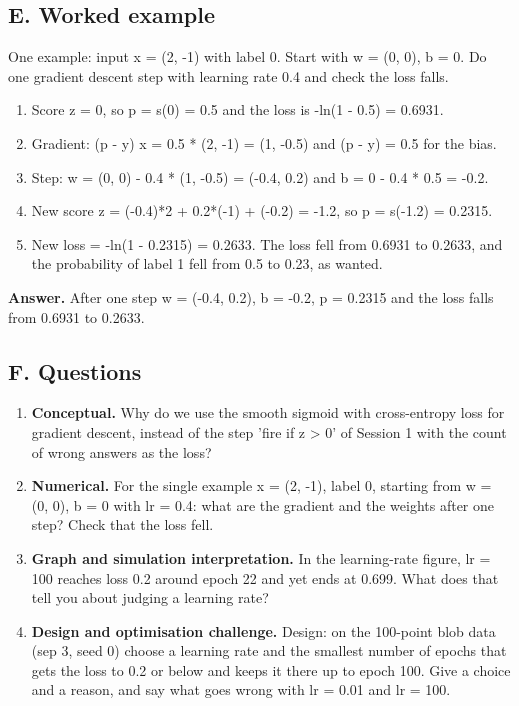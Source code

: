 \documentclass[11pt,a4paper]{article}
\begin{document}
\subsection*{E. Worked example}
One example: input x = (2, -1) with label 0. Start with w = (0, 0), b = 0. Do one gradient descent step with learning rate 0.4 and check the loss falls.
\begin{enumerate}[nosep]
\item Score z = 0, so p = s(0) = 0.5 and the loss is -ln(1 - 0.5) = 0.6931.
\item Gradient: (p - y) x = 0.5 * (2, -1) = (1, -0.5) and (p - y) = 0.5 for the bias.
\item Step: w = (0, 0) - 0.4 * (1, -0.5) = (-0.4, 0.2) and b = 0 - 0.4 * 0.5 = -0.2.
\item New score z = (-0.4)*2 + 0.2*(-1) + (-0.2) = -1.2, so p = s(-1.2) = 0.2315.
\item New loss = -ln(1 - 0.2315) = 0.2633. The loss fell from 0.6931 to 0.2633, and the probability of label 1 fell from 0.5 to 0.23, as wanted.
\end{enumerate}
\textbf{Answer.} After one step w = (-0.4, 0.2), b = -0.2, p = 0.2315 and the loss falls from 0.6931 to 0.2633.

\subsection*{F. Questions}
\begin{enumerate}[nosep]
\item \textbf{Conceptual.} Why do we use the smooth sigmoid with cross-entropy loss for gradient descent, instead of the step 'fire if z \textgreater{} 0' of Session 1 with the count of wrong answers as the loss?
\item \textbf{Numerical.} For the single example x = (2, -1), label 0, starting from w = (0, 0), b = 0 with lr = 0.4: what are the gradient and the weights after one step? Check that the loss fell.
\item \textbf{Graph and simulation interpretation.} In the learning-rate figure, lr = 100 reaches loss 0.2 around epoch 22 and yet ends at 0.699. What does that tell you about judging a learning rate?
\item \textbf{Design and optimisation challenge.} Design: on the 100-point blob data (sep 3, seed 0) choose a learning rate and the smallest number of epochs that gets the loss to 0.2 or below and keeps it there up to epoch 100. Give a choice and a reason, and say what goes wrong with lr = 0.01 and lr = 100.
\end{enumerate}
\end{document}
